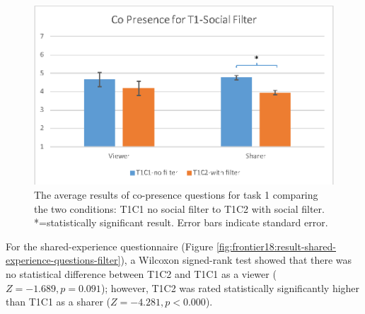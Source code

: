 \begin{figure}[ht]
    \begin{center}
    \includegraphics[width=.8\linewidth]{images/54-hiding-frontier18/images-10.eps}
    \caption{The average results of co-presence questions for task 1 comparing the two conditions: T1C1 no social filter to T1C2 with social filter. *=statistically significant result. Error bars indicate standard error.}
    \label{fig:frontier18:result-copresence-filter}
    \end{center}
\end{figure}


For the shared-experience questionnaire (Figure \ref{fig:frontier18:result-shared-experience-questions-filter}), a Wilcoxon signed-rank test showed that there was no statistical difference between T1C2 and T1C1 as a viewer ($Z=-1.689, p=0.091$); however, T1C2 was rated statistically significantly higher than T1C1 as a sharer ($Z=-4.281, p<0.000$).

